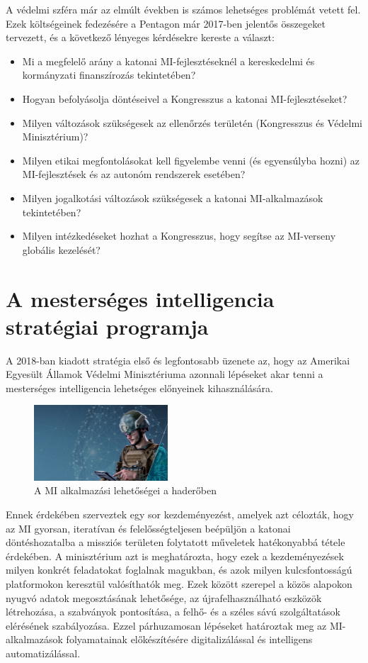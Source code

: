\documentclass[
]{thesis-ekf}
\theoremstyle{definition}
\theoremstyle{remark}
\begin{document}
	A védelmi szféra már az elmúlt években is számos lehetséges problémát vetett fel. Ezek költségeinek fedezésére a Pentagon már 2017-ben jelentős összegeket tervezett, és a következő lényeges kérdésekre kereste a választ:
	\begin{itemize}
	\item Mi a megfelelő arány a katonai MI-fejlesztéseknél a kereskedelmi és kormányzati finanszírozás tekintetében?
	\item Hogyan befolyásolja döntéseivel a Kongresszus a katonai MI-fejlesztéseket?
	\item Milyen változások szükségesek az ellenőrzés területén (Kongresszus és Védelmi Minisztérium)?
	\item Milyen etikai megfontolásokat kell figyelembe venni (és egyensúlyba hozni) az MI-fejlesztések és az autonóm rendszerek esetében?
	\item Milyen jogalkotási változások szükségesek a katonai MI-alkalmazások tekintetében?
	\item Milyen intézkedéseket hozhat a Kongresszus, hogy segítse az MI-verseny globális kezelését?
	\end{itemize}




\chapter{A mesterséges intelligencia stratégiai programja}\label{chapter2}
A 2018-ban kiadott stratégia első és legfontosabb üzenete az, hogy az Amerikai Egyesült Államok Védelmi Minisztériuma azonnali lépéseket akar tenni a mesterséges intelligencia lehetséges előnyeinek kihasználására. 

\begin{figure} [h]
	\centering
	\includegraphics[width=5cm]{AI.png}
	\caption[]{A MI alkalmazási lehetőségei a haderőben}
	\label{fig:ai-kep}
\end{figure}

Ennek érdekében szerveztek egy sor kezdeményezést, amelyek azt célozták, hogy az MI gyorsan, iteratívan és felelősségteljesen beépüljön a katonai döntéshozatalba a missziós területen folytatott műveletek hatékonyabbá tétele érdekében. A minisztérium azt is meghatározta, hogy ezek a kezdeményezések milyen konkrét feladatokat foglalnak magukban, és azok milyen kulcsfontosságú platformokon keresztül valósíthatók meg. Ezek között szerepel a közös alapokon nyugvó adatok megosztásának lehetősége, az újrafelhasználható eszközök létrehozása, a szabványok pontosítása, a felhő- és a széles sávú szolgáltatások elérésének szabályozása. Ezzel párhuzamosan lépéseket határoztak meg az MI-alkalmazások folyamatainak előkészítésére digitalizálással és intelligens automatizálással.
\end{document}
